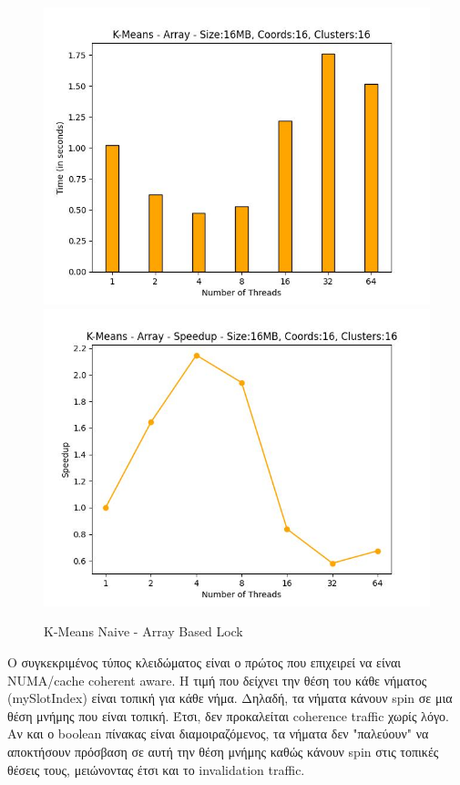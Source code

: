 \documentclass[../final_report.tex]{subfiles}
\begin{document}
\begin{figure}[H]
    \centering
        \includegraphics[scale=0.48]{outFilesCores/plots/kmeans_locks_array.jpg}
        \includegraphics[scale=0.48]{outFilesCores/plots/kmeans_locks_array_speedup.jpg}
    \caption{K-Means Naive - Array Based Lock}
    \label{fig:K-Means Naive - Array Based Lock}
\end{figure}

Ο συγκεκριμένος τύπος κλειδώματος είναι ο πρώτος που επιχειρεί να είναι NUMA/cache coherent aware. Η τιμή που δείχνει
την θέση του κάθε νήματος (mySlotIndex) είναι τοπική για κάθε νήμα. Δηλαδή, τα νήματα κάνουν spin σε μια θέση 
μνήμης που είναι τοπική. Έτσι, δεν προκαλείται coherence traffic χωρίς λόγο. Αν και ο boolean πίνακας είναι 
διαμοιραζόμενος, τα νήματα δεν "παλεύουν" να αποκτήσουν πρόσβαση σε αυτή την θέση μνήμης καθώς κάνουν
spin στις τοπικές θέσεις τους, μειώνοντας έτσι και το invalidation traffic.
\end{document}
